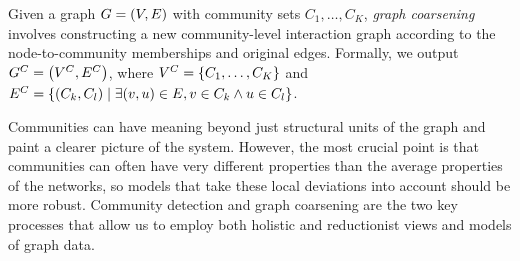 \begin{definition}
    Given a graph $G=\mathopen{}\left(V,E\right)$ with community sets $C_1, \dots, C_K$, \emph{graph coarsening} involves constructing a new community-level interaction graph according to the node-to-community memberships and original edges. Formally, we output $G^C=\mathopen{}\left(V^C,E^C\right)$, where $V^C=\mathopen{}\left\{C_1,\dots,C_K\right\}$ and $E^C=\mathopen{}\left\{\mathopen{}\left(C_k,C_l\right) \mid \exists \mathopen{}\left(v,u\right) \in E,v \in C_k \wedge u \in C_l\right\}$.
\end{definition}

Communities can have meaning beyond just structural units of the graph and paint a clearer picture of the system. However, the most crucial point is that communities can often have very different properties than the average properties of the networks, so models that take these local deviations into account should be more robust. Community detection and graph coarsening are the two key processes that allow us to employ both holistic and reductionist views and models of graph data.






